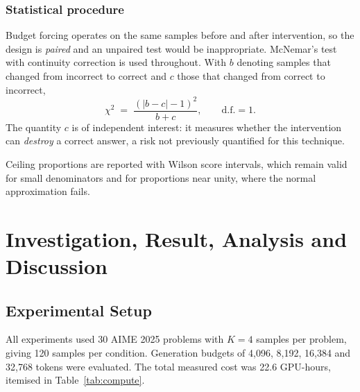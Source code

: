 \documentclass[12pt,a4paper,oneside]{report}
\begin{document}
\subsection{Statistical procedure}

Budget forcing operates on the same samples before and after intervention, so
the design is \emph{paired} and an unpaired test would be inappropriate.
McNemar's test with continuity correction is used throughout. With $b$ denoting
samples that changed from incorrect to correct and $c$ those that changed from
correct to incorrect,
\begin{equation}
\chi^{2} \;=\; \frac{\left(|b - c| - 1\right)^{2}}{b + c},
\qquad \text{d.f.} = 1 .
\label{eq:mcnemar}
\end{equation}
The quantity $c$ is of independent interest: it measures whether the
intervention can \emph{destroy} a correct answer, a risk not previously
quantified for this technique.

Ceiling proportions are reported with Wilson score intervals, which remain valid
for small denominators and for proportions near unity, where the normal
approximation fails.

\chapter{Investigation, Result, Analysis and Discussion}

\section{Experimental Setup}

All experiments used 30 AIME 2025 problems with $K=4$ samples per problem,
giving 120 samples per condition. Generation budgets of 4{,}096, 8{,}192,
16{,}384 and 32{,}768 tokens were evaluated. The total measured cost was 22.6
GPU-hours, itemised in Table~\ref{tab:compute}.
\end{document}
